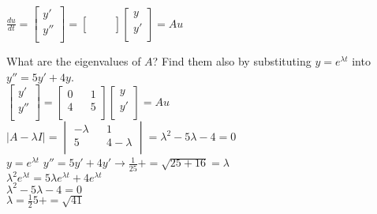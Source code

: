 \documentclass[10pt,twoside,reqno]{article}
\begin{document}
\begin{enumerate}
\begin{center}
$
$$
\frac{du}{dt} =
\begin{bmatrix}
y'\\
y''\\
\end{bmatrix}
=
\begin{bmatrix}
&&\\
&&\\
\end{bmatrix}
\begin{bmatrix}
y\\
y'\\
\end{bmatrix}
= Au
$$
$\\
\end{center}
What are the eigenvalues of $A$? Find them also by substituting $y = e^{\lambda t}$ into  $y'' = 5y' + 4y$.\\
$
$$
\begin{bmatrix}
y'\\
y''\\
\end{bmatrix}
=
\begin{bmatrix}
0 && 1\\
4 && 5\\
\end{bmatrix}
\begin{bmatrix}
y\\
y'\\
\end{bmatrix}
= Au
$$
$\\
$
$$
\left| A - \lambda I \right|
=
\begin{vmatrix}
-\lambda && 1\\
5 && 4-\lambda\\
\end{vmatrix}
=
\lambda^2 - 5\lambda - 4 = 0
$$
$\\
$y = e^{\lambda t}$
\hspace{3mm}
$y'' = 5y' + 4y' \rightarrow \frac{1}{25} += \sqrt{25 + 16} = \lambda$\\
\hspace{45mm}
$\lambda^2e^{\lambda t} = 5 \lambda e^{\lambda t} + 4e^{\lambda t}$\\
\hspace{45mm}
$\lambda^2 - 5 \lambda - 4 = 0$\\
\hspace{45mm}
$\lambda = \frac{1}{2} 5 += \sqrt{41}$\\

\end{enumerate}
\end{document}
